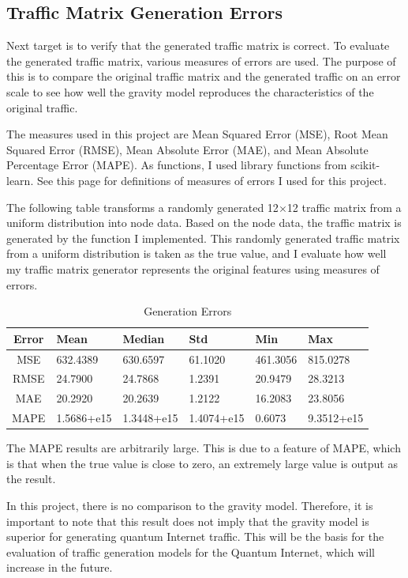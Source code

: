 \subsection{Traffic Matrix Generation Errors}
Next target is to verify that the generated traffic matrix is correct.
To evaluate the generated traffic matrix, various measures of errors are used.
The purpose of this is to compare the original traffic matrix and the generated traffic on an error scale to see how well the gravity model reproduces the characteristics of the original traffic.

The measures used in this project are Mean Squared Error (MSE), Root Mean Squared Error (RMSE), Mean Absolute Error (MAE), and Mean Absolute Percentage Error (MAPE).
As functions, I used library functions from scikit-learn.
See this page for definitions of measures of errors I used for this project.\cite{scikit-learn}

The following table transforms a randomly generated 12$\times$12 traffic matrix from a uniform distribution into node data. 
Based on the node data, the traffic matrix is generated by the function I implemented. 
This randomly generated traffic matrix from a uniform distribution is taken as the true value, and I evaluate how well my traffic matrix generator represents the original features using measures of errors.
\begin{table}[H]
    \centering
      \caption{Generation Errors}
      \label{table:loss}
      \small
      \begin{tabular}{|c||l|l|l|l|l|}  \hline
        Error & Mean & Median & Std & Min & Max \\ \hline
        MSE & 632.4389 & 630.6597 & 61.1020 & 461.3056 & 815.0278 \\
        RMSE & 24.7900 & 24.7868 & 1.2391 & 20.9479 & 28.3213 \\
        MAE & 20.2920 & 20.2639 & 1.2122 & 16.2083 & 23.8056 \\
        MAPE & 1.5686+e15 & 1.3448+e15 & 1.4074+e15 & 0.6073 & 9.3512+e15 \\ \hline
      \end{tabular}
\end{table}

The MAPE results are arbitrarily large. 
This is due to a feature of MAPE, which is that when the true value is close to zero, an extremely large value is output as the result.

In this project, there is no comparison to the gravity model. 
Therefore, it is important to note that this result does not imply that the gravity model is superior for generating quantum Internet traffic.
This will be the basis for the evaluation of traffic generation models for the Quantum Internet, which will increase in the future.
